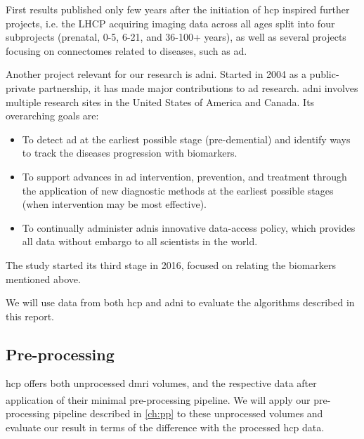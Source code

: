 \documentclass[plainreport]{cgvpub}
\newcommand{\newcite}[1]{\textsuperscript{\cite{#1}}}
\begin{document}
	First results published only few years after the initiation of \acrshort{hcp} inspired further projects, i.e. the \Gls{LHCP} acquiring imaging data across all ages split into four subprojects (prenatal, 0-5, 6-21, and 36-100+ years), as well as several projects focusing on connectomes related to diseases, such as \acrshort{ad}.
	
	Another project relevant for our research is \acrfull{adni}. Started in 2004 as a public-private partnership, it has made major contributions to \acrshort{ad} research. \acrshort{adni} involves multiple research sites in the United States of America and Canada. Its overarching goals are:
	\begin{itemize}
		\item To detect \acrshort{ad} at the earliest possible stage (pre-demential) and identify ways to track the diseases progression with biomarkers.
		\item To support advances in \acrshort{ad} intervention, prevention, and treatment through the application of new diagnostic methods at the earliest possible stages (when intervention may be most effective).
		\item To continually administer \acrshort{adni}s innovative data-access policy, which provides all data without embargo to all scientists in the world.
	\end{itemize}
	The study started its third stage in 2016, focused on relating the biomarkers mentioned above.
	
	We will use data from both \acrshort{hcp} and \acrshort{adni} to evaluate the algorithms described in this report. 
	
	\subsection{Pre-processing}
	\acrshort{hcp} offers both unprocessed \acrshort{dmri} volumes, and the respective data after application of their minimal pre-processing pipeline\newcite{hcp_mpp}. We will apply our pre-processing pipeline described in \ref{ch:pp} to these unprocessed volumes and evaluate our result in terms of the difference with the processed \acrshort{hcp} data.

	\printglossary[type=gloss_terms]
	\printglossary[type=gloss_acr]
	\nocite{*}
	
	
\end{document}
